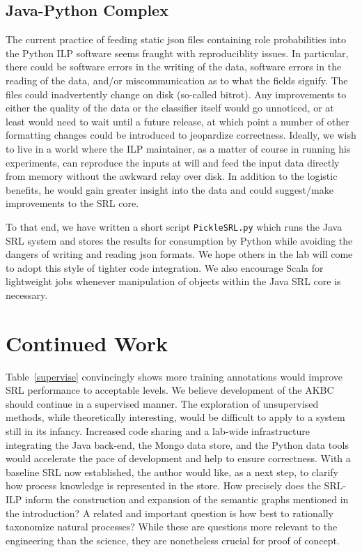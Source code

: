 \documentclass{article} %
\begin{document}
\subsection{Java-Python Complex}
The current practice of feeding static json files containing role probabilities into the Python ILP software seems fraught with reproduciblity issues.  In particular, there could be software errors in the writing of the data, software errors in the reading of the data, and/or miscommunication as to what the fields signify.  The files could inadvertently change on disk (so-called bitrot).  Any improvements to either the quality of the data or the classifier itself would go unnoticed, or at least would need to wait until a future release, at which point a number of other formatting changes could be introduced to jeopardize correctness.  Ideally, we wish to live in a world where the ILP maintainer, as a matter of course in running his experiments, can reproduce the inputs at will and feed the input data directly from memory without the awkward relay over disk.  In addition to the logistic benefits, he would gain greater insight into the data and could suggest/make improvements to the SRL core.

To that end, we have written a short script {\tt PickleSRL.py} which runs the Java SRL system and stores the results for consumption by Python while avoiding the dangers of writing and reading json formats.  We hope others in the lab will come to adopt this style of tighter code integration.  We also encourage Scala for lightweight jobs whenever manipulation of objects within the Java SRL core is necessary.

\section{Continued Work}
Table~\ref{supervise} convincingly shows more training annotations would improve SRL performance to acceptable levels.  We believe development of the AKBC should continue in a supervised manner.  The exploration of unsupervised methods, while theoretically interesting, would be difficult to apply to a system still in its infancy.  Increased code sharing and a lab-wide infrastructure integrating the Java back-end, the Mongo data store, and the Python data tools would accelerate the pace of development and help to ensure correctness.  With a baseline SRL now established, the author would like, as a next step, to clarify how process knowledge is represented in the store.  How precisely does the SRL-ILP inform the construction and expansion of the semantic graphs mentioned in the introduction?  A related and important question is how best to rationally taxonomize natural processes?  While these are questions more relevant to the engineering than the science, they are nonetheless crucial for proof of concept.

\small{
\printbibliography
}
\end{document}
